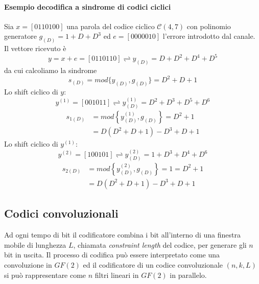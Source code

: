                 \paragraph{Esempio decodifica a sindrome di codici ciclici}
                Sia $x=[0110100]$ una parola del codice ciclico $\mathcal{C}(4,7)$ con polinomio generatore $g_{(D)} = 1 + D + D^3$
                ed $e=[0000010]$ l'errore introdotto dal canale. Il vettore ricevuto è 
                \[
                    y= x+e = [0110110]\rightleftharpoons y_{(D)} = D+D^2+D^4+D^5 
                \]
                da cui calcoliamo la sindrome 
                \[
                    s_{(D)} = mod\{y_{(D)},g_{(D)}\}=D^2+D+1
                \]
                Lo shift ciclico di $y$:
                \[
                    y^{(1)} = [001011] \rightleftharpoons y^{(1)}_{(D)} = D^2+D^3+D^5+D^6   
                \]
                \begin{align}
                    s_{1(D)} &= mod\left\{y^{(1)}_{(D)},g_{(D)}\right\}= D^2+1  \nonumber \\
                             &= D(D^2+D+1)-D^3+D+1 \nonumber
                \end{align}
                Lo shift ciclico di $y^{(1)}$:
                \[
                    y^{(2)} = [100101] \rightleftharpoons y^{(2)}_{(D)} = 1+D^3+D^4+D^6   
                \]
                \begin{align}
                    s_{2(D)} &= mod\left\{y^{(2)}_{(D)},g_{(D)}\right\}= 1 = D^2+1  \nonumber \\
                             &= D(D^2+D+1)-D^3+D+1 \nonumber
                \end{align}
    \subsection{Codici convoluzionali}
        Ad ogni tempo di bit il codificatore combina i bit
        all'interno di una finestra mobile di lunghezza $L$, chiamata \emph{constraint length} del codice, per generare gli $n$ 
        bit in uscita. Il processo di codifica può essere interpretato come una convoluzione in $GF(2)$ ed il codificatore di
        un codice convoluzionale $(n,k,L)$ si può rappresentare come $n$ filtri lineari in $GF(2)$ in parallelo.
